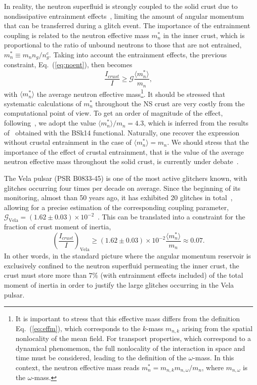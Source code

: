 In reality, the neutron superfluid is strongly coupled to the solid crust due
to nondissipative entrainment effects~\cite{Chamel2013}, limiting the amount of
angular momentum that can be transferred during a glitch event. The importance
of the entrainment coupling is related to the neutron effective mass $m_n^*$ in
the inner crust, which is proportional to the ratio of unbound neutrons to 
those that are not entrained, $m_n^* \equiv m_n n_g/n_g^c$. Taking into 
account the entrainment effects, the previous constraint, Eq.~(\ref{eq:noent}), 
then becomes~\cite{Carter2005,Andersson2012}
%
\begin{equation}
  \frac{I_{crust}}{I} \geq \mathcal{G}\frac{\langle m_n^*
  \rangle}{m_n},\label{eq:ifrac_g}
\end{equation}
%
with $\langle m_n^* \rangle$ the average neutron effective
mass\footnote{{It is important to stress that this effective mass differs 
    from the definition Eq.~(\ref{eq:effm}), which corresponds to the $k$-mass 
    $m_{n,k}$ arising from the spatial nonlocality of the mean field. For
    transport properties, which correspond to a dynamical phenomemon, the full
    nonlocality of the interaction in space and time must be considered,
    leading to the definition of the $\omega$-mass. In this context,  the 
    neutron effective mass reads $m_n^* = m_{n,k} m_{n,\omega}/m_n$, where 
    $m_{n,\omega}$ is the $\omega$-mass.}}.
It should be stressed that systematic calculations of $m_n^*$ throughout 
the NS crust are very costly from the computational point of view. To get an 
order of magnitude of the effect, 
following~\cite{Andersson2012,Piekarewicz2014}, we adopt the 
value $\langle m_n^* \rangle /m_n = 4.3$, which is inferred from the 
results of~\cite{Chamel2012} obtained with the BSk14 functional. 
Naturally, one recover the expression without 
crustal entrainment in the case of $\langle m_n^* \rangle = m_n$. We should 
stress that the importance of the effect of crustal entrainment, that is the 
value of the average neutron effective mass throughout the solid crust, is 
currently under debate~\cite{Martin2016,Watanabe2017}.

The Vela pulsar (PSR B0833-45) is one of the most active glitchers known, with
glitches occurring four times per decade on average. Since the beginning of its 
monitoring, almost than 50 years ago, it has exhibited 20 glitches in
total~\cite{Glitches}, allowing for a precise estimation of the corresponding 
coupling parameter, $\mathcal{G}_{\text{Vela}} = (1.62 \pm 0.03) \times
10^{-2}$~\cite{Ho2015}. This can be translated into a constraint for 
the fraction of crust moment of inertia,
%
\begin{equation}
  \left(\frac{I_{crust}}{I}\right)_{\text{Vela}} \geq (1.62 \pm 0.03) \times 10^{-2}
  \frac{\langle m_n^* \rangle}{m_n} \approx 0.07.
\end{equation}
%
In other words, in the standard picture where the angular momentum reservoir is 
exclusively confined to the neutron superfluid permeating the inner crust, the 
crust must store more than $7\%$ (with entrainment effects included) of the 
total moment of inertia in order to justify the large glitches occurring in the 
Vela pulsar.

